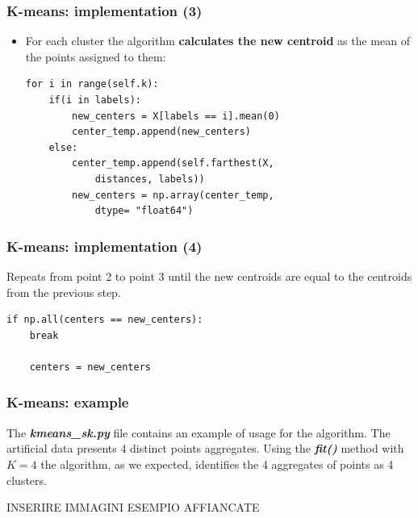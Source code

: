 \documentclass[xcolor ={table,usenames,dvipsnames}]{beamer}
\theoremstyle{definition}
\begin{document}
	\begin{frame}[fragile]
		\frametitle{K-means: implementation (3)}	
		\begin{itemize}
			\item For each cluster the algorithm \textbf{calculates the new centroid} as the mean of the points assigned to them:
			
			\begin{lstlisting}
for i in range(self.k):
	if(i in labels):
		new_centers = X[labels == i].mean(0)
		center_temp.append(new_centers)
	else:
		center_temp.append(self.farthest(X, 
			distances, labels))	
		new_centers = np.array(center_temp,
			dtype= "float64")
			\end{lstlisting}
		\end{itemize}
	\end{frame}

	\begin{frame}[fragile]
		\frametitle{K-means: implementation (4)}
		\item Repeats from point 2 to point 3 until the new centroids are equal to the centroids from the previous step.
		\begin{lstlisting}
if np.all(centers == new_centers):
	break
		
	centers = new_centers
		\end{lstlisting}
	\end{frame}

	\begin{frame}[fragile]
		\frametitle{K-means: example}
		The \textbf{\textit{kmeans\_sk.py}} file contains an example of usage for the algorithm. The artificial data presents 4 distinct points aggregates. Using the \textbf{\textit{fit()}} method with $K = 4$ the algorithm, as we expected, identifies the 4 aggregates of points as 4 clusters.
		
		INSERIRE IMMAGINI ESEMPIO AFFIANCATE
	\end{frame}
\end{document}

